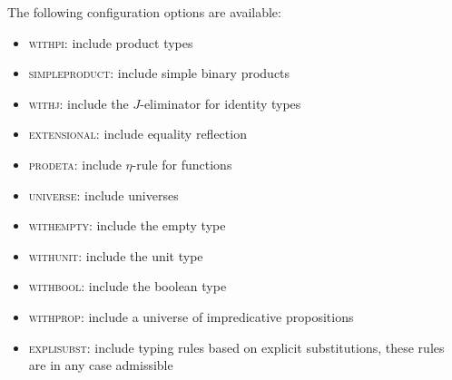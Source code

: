 
The following configuration options are available:
%
\begin{itemize}
\item \textsc{withpi}: include product types
\item \textsc{simpleproduct}: include simple binary products
\item \textsc{withj}: include the $J$-eliminator for identity types
\item \textsc{extensional}: include equality reflection
\item \textsc{prodeta}: include $\eta$-rule for functions
\item \textsc{universe}: include universes
\item \textsc{withempty}: include the empty type
\item \textsc{withunit}: include the unit type
\item \textsc{withbool}: include the boolean type
\item \textsc{withprop}: include a universe of impredicative propositions
\item \textsc{explisubst}: include typing rules based on explicit substitutions,
  these rules are in any case admissible
\end{itemize}
